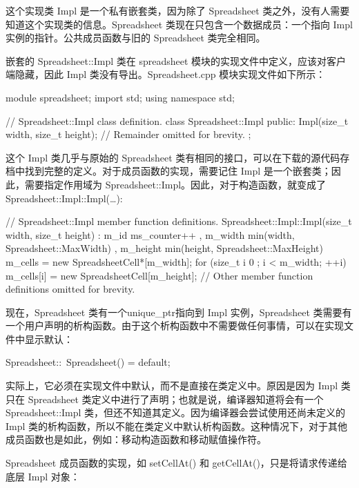 这个实现类 Impl 是一个私有嵌套类，因为除了 Spreadsheet 类之外，没有人需要知道这个实现类的信息。Spreadsheet 类现在只包含一个数据成员：一个指向 Impl 实例的指针。公共成员函数与旧的 Spreadsheet 类完全相同。

嵌套的 Spreadsheet::Impl 类在 spreadsheet 模块的实现文件中定义，应该对客户端隐藏，因此 Impl 类没有导出。Spreadsheet.cpp 模块实现文件如下所示：

\begin{cpp}
module spreadsheet;
import std;
using namespace std;

// Spreadsheet::Impl class definition.
class Spreadsheet::Impl
{
    public:
        Impl(size_t width, size_t height);
        // Remainder omitted for brevity.
};
\end{cpp}

这个 Impl 类几乎与原始的 Spreadsheet 类有相同的接口，可以在下载的源代码存档中找到完整的定义。对于成员函数的实现，需要记住 Impl 是一个嵌套类；因此，需要指定作用域为 Spreadsheet::Impl。因此，对于构造函数，就变成了 Spreadsheet::Impl::Impl(…):

\begin{cpp}
// Spreadsheet::Impl member function definitions.
Spreadsheet::Impl::Impl(size_t width, size_t height)
    : m_id { ms_counter++ }
    , m_width { min(width, Spreadsheet::MaxWidth) }
    , m_height { min(height, Spreadsheet::MaxHeight) }
{
    m_cells = new SpreadsheetCell*[m_width];
    for (size_t i { 0 }; i < m_width; ++i) {
        m_cells[i] = new SpreadsheetCell[m_height];
    }
}
// Other member function definitions omitted for brevity.
\end{cpp}

现在，Spreadsheet 类有一个unique\_ptr指向到 Impl 实例，Spreadsheet 类需要有一个用户声明的析构函数。由于这个析构函数中不需要做任何事情，可以在实现文件中显示默认：

\begin{cpp}
Spreadsheet::~Spreadsheet() = default;
\end{cpp}

实际上，它必须在实现文件中默认，而不是直接在类定义中。原因是因为 Impl 类只在 Spreadsheet 类定义中进行了声明；也就是说，编译器知道将会有一个 Spreadsheet::Impl 类，但还不知道其定义。因为编译器会尝试使用还尚未定义的 Impl 类的析构函数，所以不能在类定义中默认析构函数。这种情况下，对于其他成员函数也是如此，例如：移动构造函数和移动赋值操作符。

Spreadsheet 成员函数的实现，如 setCellAt() 和 getCellAt()，只是将请求传递给底层 Impl 对象：

